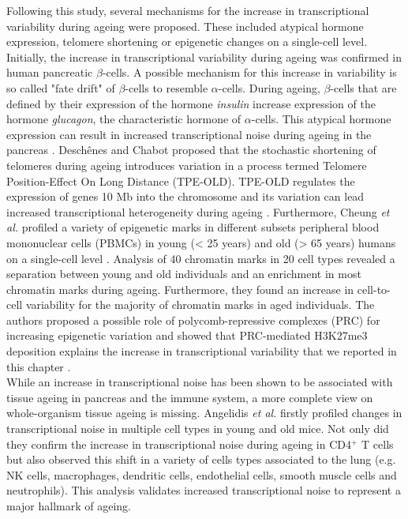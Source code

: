 Following this study, several mechanisms for the increase in transcriptional variability during ageing were proposed. These included atypical hormone expression, telomere shortening or epigenetic changes on a single-cell level. \\
Initially, the increase in transcriptional variability during ageing was confirmed in human pancreatic $\beta$-cells. A possible mechanism for this increase in variability is so called "fate drift" of $\beta$-cells to resemble $\alpha$-cells. During ageing, $\beta$-cells that are defined by their expression of the hormone \emph{insulin} increase expression of the hormone \emph{glucagon}, the characteristic hormone of $\alpha$-cells. This atypical hormone expression can result in increased transcriptional noise during ageing in the pancreas \citep{Enge2017}. Desch\^{e}nes and Chabot proposed that the stochastic shortening of telomeres during ageing introduces variation in a process termed Telomere Position-Effect On Long Distance (TPE-OLD). 	TPE-OLD regulates the expression of genes 10 Mb into the chromosome and its variation can lead increased transcriptional heterogeneity during ageing \cite{Deschenes2017}. Furthermore, Cheung \emph{et al.} profiled a variety of epigenetic marks in different subsets peripheral blood mononuclear cells (PBMCs) in young (< 25 years) and old (> 65 years) humans on a single-cell level \citep{Cheung2018}. Analysis of 40 chromatin marks in 20 cell types revealed a separation between young and old individuals and an enrichment in most chromatin marks during ageing. Furthermore, they found an increase in cell-to-cell variability for the majority of chromatin marks in aged individuals. The authors proposed a possible role of polycomb-repressive complexes (PRC) for increasing epigenetic variation and showed that PRC-mediated H3K27me3 deposition explains the increase in transcriptional variability that we reported in this chapter \citep{Cheung2018}.\\

While an increase in transcriptional noise has been shown to be associated with tissue ageing in pancreas and the immune system, a more complete view on whole-organism tissue ageing is missing. Angelidis \emph{et al.} firstly profiled changes in transcriptional noise in multiple cell types in young and old mice. Not only did they confirm the increase in transcriptional noise during ageing in CD4$^+$ T cells but also observed this shift in a variety of cells types associated to the lung (e.g. NK cells, macrophages, dendritic cells, endothelial cells, smooth muscle cells and neutrophils). This analysis validates increased transcriptional noise to represent a major hallmark of ageing. \\

